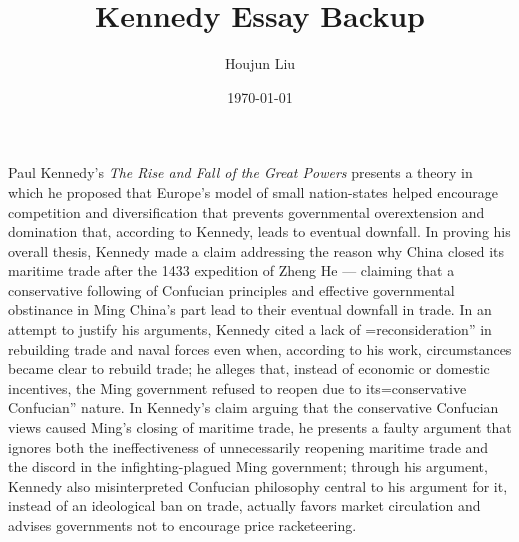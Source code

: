 \documentclass[letterpaper]{article}
\author{Houjun Liu}
\date{\today}
\title{Kennedy Essay Backup}
\renewcommand\maketitle{}
\begin{document}
\maketitle
Paul Kennedy's \textit{The Rise and Fall of the Great Powers} presents a
theory in which he proposed that Europe's model of small nation-states
helped encourage competition and diversification that prevents
governmental overextension and domination that, according to Kennedy,
leads to eventual downfall. In proving his overall thesis, Kennedy made
a claim addressing the reason why China closed its maritime trade after
the 1433 expedition of Zheng He --- claiming that a conservative
following of Confucian principles and effective governmental obstinance
in Ming China's part lead to their eventual downfall in trade. In an
attempt to justify his arguments, Kennedy cited a lack of
=reconsideration'' in rebuilding trade and naval forces even when, according to his work, circumstances became clear to rebuild trade; he alleges that, instead of economic or domestic incentives, the Ming government refused to reopen due to its=conservative
Confucian'' nature. In Kennedy's claim arguing that the conservative
Confucian views caused Ming's closing of maritime trade, he presents a
faulty argument that ignores both the ineffectiveness of unnecessarily
reopening maritime trade and the discord in the infighting-plagued Ming
government; through his argument, Kennedy also misinterpreted Confucian
philosophy central to his argument for it, instead of an ideological ban
on trade, actually favors market circulation and advises governments not
to encourage price racketeering.
\end{document}
